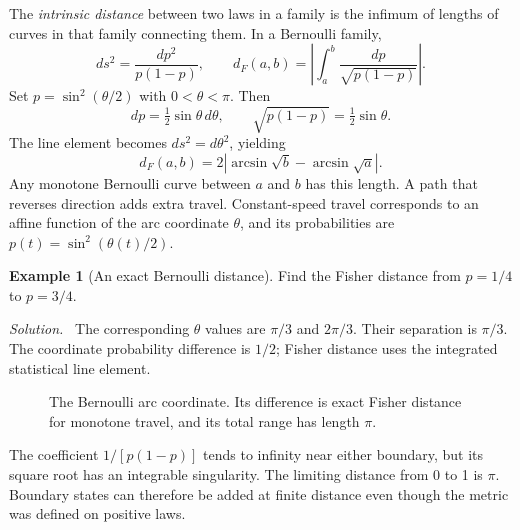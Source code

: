 \documentclass[11pt,oneside,openany]{book}
\theoremstyle{definition}
\newtheorem{example}{Example}[chapter]
\theoremstyle{remark}
\newenvironment{solution}{\par\smallskip\noindent\textit{Solution.}\ }{\par\smallskip}
\numberwithin{equation}{chapter}
\begin{document}
The \emph{intrinsic distance} between two laws in a family is the infimum of lengths of curves in that family connecting them. In a Bernoulli family,
\[
ds^2=\frac{dp^2}{p(1-p)},\qquad
d_F(a,b)=\left|\int_a^b\frac{dp}{\sqrt{p(1-p)}}\right|.
\]
Set $p=\sin^2(\theta/2)$ with $0<\theta<\pi$. Then
\[
dp=\tfrac12\sin\theta\,d\theta,
\qquad \sqrt{p(1-p)}=\tfrac12\sin\theta.
\]
The line element becomes $ds^2=d\theta^2$, yielding
\begin{equation}\label{eq:bernoullidistance}
\boxed{d_F(a,b)=2\left|\arcsin\sqrt b-\arcsin\sqrt a\right|.}
\end{equation}
Any monotone Bernoulli curve between $a$ and $b$ has this length. A path that reverses direction adds extra travel. Constant-speed travel corresponds to an affine function of the arc coordinate $\theta$, and its probabilities are $p(t)=\sin^2(\theta(t)/2)$.

\begin{example}[An exact Bernoulli distance]
Find the Fisher distance from $p=1/4$ to $p=3/4$.
\begin{solution}
The corresponding $\theta$ values are $\pi/3$ and $2\pi/3$. Their separation is $\pi/3$. The coordinate probability difference is $1/2$; Fisher distance uses the integrated statistical line element.
\end{solution}
\end{example}

\begin{figure}[htbp]
\centering
{}
\caption{The Bernoulli arc coordinate. Its difference is exact Fisher distance for monotone travel, and its total range has length $\pi$.}
\end{figure}

The coefficient $1/[p(1-p)]$ tends to infinity near either boundary, but its square root has an integrable singularity. The limiting distance from 0 to 1 is $\pi$. Boundary states can therefore be added at finite distance even though the metric was defined on positive laws.
\end{document}
